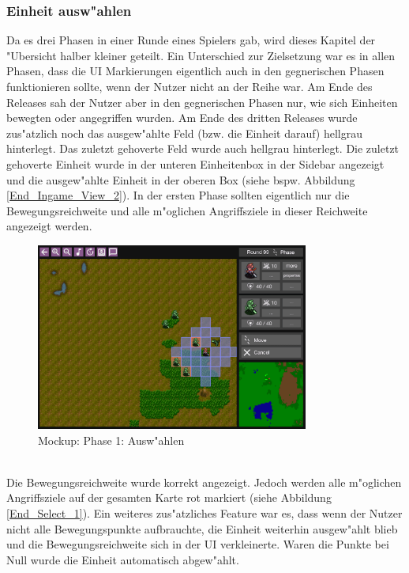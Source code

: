 \documentclass[12pt, titlepage]{scrartcl}
\newcounter{subsubsubsection}[subsubsection]
\begin{document}
			\subsubsection{Einheit ausw"ahlen} \label{END_SELECT}
				Da es drei Phasen in einer Runde eines Spielers gab, wird dieses Kapitel der "Ubersicht halber kleiner geteilt. Ein Unterschied zur Zielsetzung war es in allen Phasen, dass die UI Markierungen eigentlich auch in den gegnerischen Phasen funktionieren sollte, wenn der Nutzer nicht an der Reihe war. Am Ende des Releases sah der Nutzer aber in den gegnerischen Phasen nur, wie sich Einheiten bewegten oder angegriffen wurden. Am Ende des dritten Releases wurde zus"atzlich noch das ausgew"ahlte Feld (bzw. die Einheit darauf) hellgrau hinterlegt. Das zuletzt gehoverte Feld wurde auch hellgrau hinterlegt. Die zuletzt gehoverte Einheit wurde in der unteren Einheitenbox in der Sidebar angezeigt und die ausgew"ahlte Einheit in der oberen Box (siehe bspw. Abbildung \ref{End_Ingame_View_2}).
					In der ersten Phase sollten eigentlich nur die Bewegungsreichweite und alle m"oglichen Angriffsziele in dieser Reichweite angezeigt werden.
					\begin{figure}[H] 
						\centering
						\includegraphics[width=0.8\textwidth]{images/mockups/Select.png}
						\caption{Mockup: Phase 1: Ausw"ahlen}
						\label{Select_1_2}
					\end{figure}
					\ \\ Die Bewegungsreichweite wurde korrekt angezeigt. Jedoch werden alle m"oglichen Angriffsziele auf der gesamten Karte rot markiert (siehe Abbildung \ref{End_Select_1}). Ein weiteres zus"atzliches Feature war es, dass wenn der Nutzer nicht alle Bewegungspunkte aufbrauchte, die Einheit weiterhin ausgew"ahlt blieb und die Bewegungsreichweite sich in der UI verkleinerte. Waren die Punkte bei Null wurde die Einheit automatisch abgew"ahlt.
\end{document}
